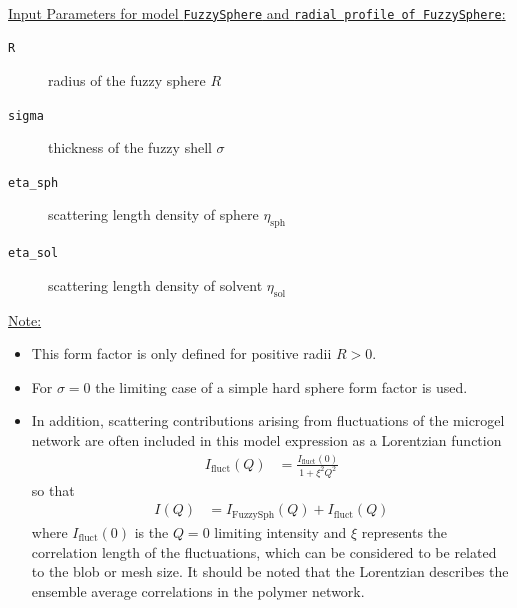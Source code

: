 \vspace{5mm}

\hspace{1pt}\\
\uline{Input Parameters for model \texttt{FuzzySphere} and \texttt{radial profile of FuzzySphere}:}\\
\begin{description}
\item[\texttt{R}] radius of the fuzzy sphere  $R$
\item[\texttt{sigma}] thickness of the fuzzy shell $\sigma$
\item[\texttt{eta\_sph}] scattering length density of sphere
$\eta_\text{sph}$ \item[\texttt{eta\_sol}] scattering length
density of solvent $\eta_\text{sol}$
\end{description}

\noindent\uline{Note:}
\begin{itemize}
\item This form factor is only defined for positive radii $R>0$.
\item For $\sigma = 0$ the limiting case of a simple hard sphere
form factor is used.
\item In addition, scattering contributions
arising from fluctuations of the microgel network are often
included in this model expression as a Lorentzian function
\begin{align}
I_\text{fluct}(Q) &= \frac{I_\text{fluct}(0)}{1+\xi^2Q^2}
\end{align}
so that
\begin{align}
I(Q) &= I_\text{FuzzySph}(Q)+I_\text{fluct}(Q)
\end{align}
where $I_\text{fluct}(0)$ is the $Q=0$ limiting intensity and
$\xi$ represents the correlation length of the fluctuations, which
can be considered to be related to the blob or mesh size. It
should be noted that the Lorentzian describes the ensemble average
correlations in the polymer network.

\end{itemize}

